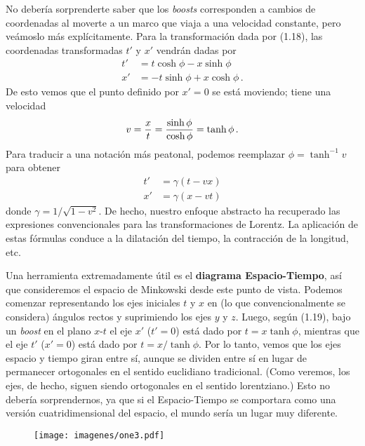 \documentclass[11pt,b5paper,openany,twoside]{book}
\begin{document}
No debería sorprenderte saber que los \textit{boosts} corresponden a cambios de coordenadas al moverte a un marco que viaja a una velocidad constante, pero veámoslo más explícitamente.
Para la transformación dada por (1.18), las coordenadas transformadas $t'$ y $x'$ vendrán dadas por
\begin{align}
t' &=  t\cosh\phi - x \sinh\phi \nonumber \\
x' &=  -t \sinh\phi + x\cosh\phi\,.\label{1.19}
\end{align}
De esto vemos que el punto definido por $x'=0$ se está moviendo; tiene una velocidad
\begin{equation}
v = {x\over t} = {{\sinh\phi}\over{\cosh\phi}} = \tanh\phi\,.
\label{1.20}
\end{equation}
Para traducir a una notación más peatonal, podemos reemplazar $\phi = \tanh^{-1}v$ para obtener
\begin{align}
t' &=  \gamma(t-vx)\nonumber \\
x' &=  \gamma(x-vt)\label{1.21}
\end{align}
donde $\gamma =1/\sqrt{1-v^2}$.
De hecho, nuestro enfoque abstracto ha recuperado las expresiones convencionales para las transformaciones de Lorentz.
La aplicación de estas fórmulas conduce a la dilatación del tiempo, la contracción de la longitud, etc.

Una herramienta extremadamente útil es el {\bf diagrama Espacio-Tiempo}, así que consideremos el espacio de Minkowski desde este punto de vista.
Podemos comenzar representando los ejes iniciales $t$ y $x$ en (lo que convencionalmente se considera) ángulos rectos y suprimiendo los ejes $y$ y $z$.
Luego, según (1.19), bajo un \textit{boost} en el plano $x$-$t$ el eje $x'$ ($t' = 0$) está dado por $t = x \tanh\phi$, mientras que el eje $t'$ ($x' = 0$) está dado por $t = x/\tanh\phi$.
Por lo tanto, vemos que los ejes espacio y tiempo giran entre sí, aunque se dividen entre sí en lugar de permanecer ortogonales en el sentido euclidiano tradicional.
(Como veremos, los ejes, de hecho, siguen siendo ortogonales en el sentido lorentziano.)
Esto no debería sorprendernos, ya que si el Espacio-Tiempo se comportara como una versión cuatridimensional del espacio, el mundo sería un lugar muy diferente.

\begin{figure}[h]
\centering
\texttt{[image: imagenes/one3.pdf]}
\end{figure}
\end{document}
